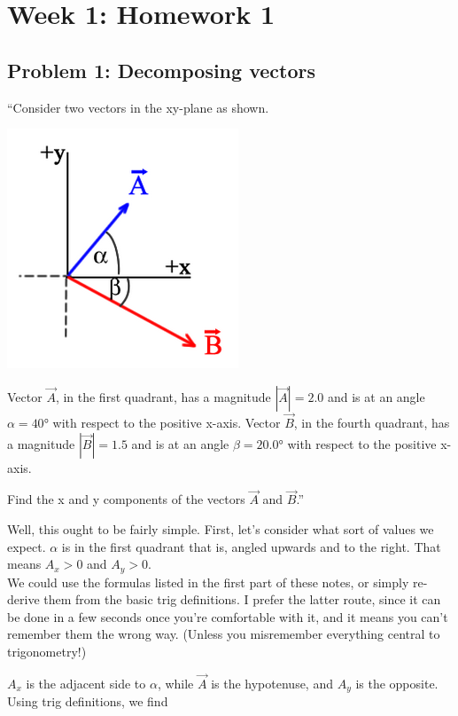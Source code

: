 \documentclass[8.01x]{subfiles}
\begin{document}
\chapter{Week 1: Homework 1}

\section{Problem 1: Decomposing vectors}

``Consider two vectors in the xy-plane as shown.

\begin{center}
\includegraphics[scale=0.8]{Graphics/h1p1}
\end{center}

Vector $\vec{A}$, in the first quadrant, has a magnitude $|\vec{A}| = 2.0$ and is at an angle $\alpha = \ang{40}$ with respect to the positive x-axis. Vector $\vec{B}$, in the fourth quadrant, has a magnitude $|\vec{B}| = 1.5$ and is at an angle $\beta = \ang{20.0}$ with respect to the positive x-axis.

Find the x and y components of the vectors $\vec{A}$ and $\vec{B}$.''

Well, this ought to be fairly simple. First, let's consider what sort of values we expect. $\alpha$ is in the first quadrant that is, angled upwards and to the right. That means $A_x > 0$ and $A_y > 0$.\\
We could use the formulas listed in the first part of these notes, or simply re-derive them from the basic trig definitions. I prefer the latter route, since it can be done in a few seconds once you're comfortable with it, and it means you can't remember them the wrong way. (Unless you misremember everything central to trigonometry!)

$A_x$ is the adjacent side to $\alpha$, while $\vec{A}$ is the hypotenuse, and $A_y$ is the opposite. Using trig definitions, we find
\end{document}
